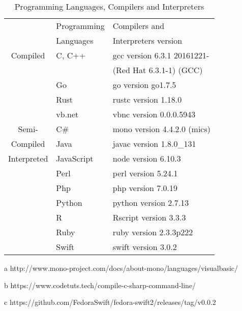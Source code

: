 \begin{table}
	\begin{threeparttable}
	\caption{Programming Languages, Compilers and Interpreters}
	\label{Languages_Compilers_and_Interpreters}
	\begin{tabular}{cll}
		\toprule
		 & Programming  & Compilers and  \\
		 & Languages  &  Interpreters version\\
		\midrule
		Compiled&C, C++	& gcc version 6.3.1 20161221- \\
		&		& (Red Hat 6.3.1-1) (GCC) \\
		&Go		& go version go1.7.5  \\
		&Rust	& rustc version 1.18.0 \\
		&{\sc vb.net} & vbnc version 0.0.0.5943\tnote{a} \\
			\midrule
		Semi-&C\#		& mono version 4.4.2.0 (mics)\tnote{b} \\
		Compiled&Java	& javac version 1.8.0\_131 \\
			\midrule
		Interpreted&JavaScript & node version 6.10.3 \\
		&Perl	& perl version 5.24.1 \\
		&Php		& php version 7.0.19 \\
		&Python	& python version 2.7.13 \\
		&R		& Rscript version 3.3.3 \\
		&Ruby	& ruby version 2.3.3p222 \\
	
		&Swift 	& swift version 3.0.2\tnote{c} \\
		
		\bottomrule
	\end{tabular}
	\begin{tablenotes}
		\begin{small}
			\item[a] {http://www.mono-project.com/docs/about-mono/languages/visualbasic/}
			\item[b] {https://www.codetuts.tech/compile-c-sharp-command-line/}
			\item[c] {https://github.com/FedoraSwift/fedora-swift2/releases/tag/v0.0.2}
		\end{small}
	\end{tablenotes}
	\end{threeparttable}
\end{table}


